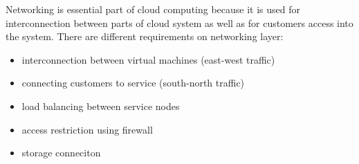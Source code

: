 

Networking is essential part of cloud computing because it is used for interconnection between parts of cloud system as well as for customers access into the system. There are different requirements on networking layer:
\begin{itemize}
	\item interconnection between virtual machines (east-west traffic)
	\item connecting customers to service (south-north traffic)
		
	\item load balancing between service nodes

	\item access restriction using firewall

	\item storage conneciton
\end{itemize}

